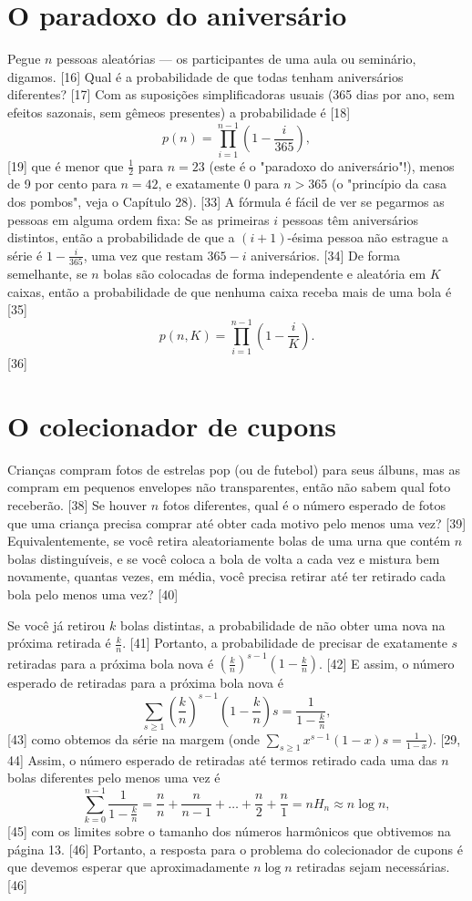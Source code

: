 \documentclass[a4paper]{article}
\begin{document}
\section{O paradoxo do aniversário}

Pegue $n$ pessoas aleatórias — os participantes de uma aula ou seminário, digamos. [16] Qual é a probabilidade de que todas tenham aniversários diferentes? [17] Com as suposições simplificadoras usuais (365 dias por ano, sem efeitos sazonais, sem gêmeos presentes) a probabilidade é [18]
$$ p(n) = \prod_{i=1}^{n-1} \left(1 - \frac{i}{365}\right), $$ [19]
que é menor que $\frac{1}{2}$ para $n=23$ (este é o "paradoxo do aniversário"!), menos de 9 por cento para $n=42$, e exatamente 0 para $n > 365$ (o "princípio da casa dos pombos", veja o Capítulo 28). [33] A fórmula é fácil de ver se pegarmos as pessoas em alguma ordem fixa: Se as primeiras $i$ pessoas têm aniversários distintos, então a probabilidade de que a $(i+1)$-ésima pessoa não estrague a série é $1 - \frac{i}{365}$, uma vez que restam $365-i$ aniversários. [34] De forma semelhante, se $n$ bolas são colocadas de forma independente e aleatória em $K$ caixas, então a probabilidade de que nenhuma caixa receba mais de uma bola é [35]
$$ p(n, K) = \prod_{i=1}^{n-1} \left(1 - \frac{i}{K}\right). $$ [36]

\section{O colecionador de cupons}

Crianças compram fotos de estrelas pop (ou de futebol) para seus álbuns, mas as compram em pequenos envelopes não transparentes, então não sabem qual foto receberão. [38] Se houver $n$ fotos diferentes, qual é o número esperado de fotos que uma criança precisa comprar até obter cada motivo pelo menos uma vez? [39] Equivalentemente, se você retira aleatoriamente bolas de uma urna que contém $n$ bolas distinguíveis, e se você coloca a bola de volta a cada vez e mistura bem novamente, quantas vezes, em média, você precisa retirar até ter retirado cada bola pelo menos uma vez? [40]

Se você já retirou $k$ bolas distintas, a probabilidade de não obter uma nova na próxima retirada é $\frac{k}{n}$. [41] Portanto, a probabilidade de precisar de exatamente $s$ retiradas para a próxima bola nova é $\left(\frac{k}{n}\right)^{s-1}\left(1-\frac{k}{n}\right)$. [42] E assim, o número esperado de retiradas para a próxima bola nova é
$$ \sum_{s \ge 1} \left(\frac{k}{n}\right)^{s-1} \left(1 - \frac{k}{n}\right) s = \frac{1}{1 - \frac{k}{n}}, $$ [43]
como obtemos da série na margem (onde $\sum_{s\ge1}x^{s-1}(1-x)s = \frac{1}{1-x}$). [29, 44] Assim, o número esperado de retiradas até termos retirado cada uma das $n$ bolas diferentes pelo menos uma vez é
$$ \sum_{k=0}^{n-1} \frac{1}{1 - \frac{k}{n}} = \frac{n}{n} + \frac{n}{n-1} + \dots + \frac{n}{2} + \frac{n}{1} = nH_n \approx n \log n, $$ [45]
com os limites sobre o tamanho dos números harmônicos que obtivemos na página 13. [46] Portanto, a resposta para o problema do colecionador de cupons é que devemos esperar que aproximadamente $n \log n$ retiradas sejam necessárias. [46]
\end{document}
